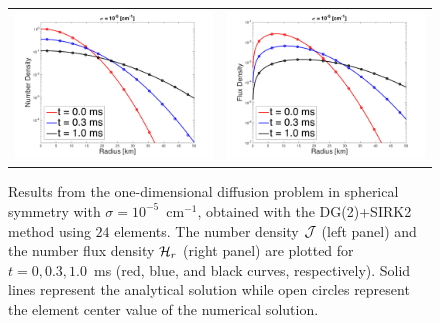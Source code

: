 \documentclass[10pt,preprint]{aastex}
\begin{document}
\begin{figure}
  \begin{center}
    \begin{tabular}{cc}
      \includegraphics[scale=0.38]{./Figures/GaussianSphericalDiffusion_Kappa_1e-5_Density} &
      \includegraphics[scale=0.38]{./Figures/GaussianSphericalDiffusion_Kappa_1e-5_Flux}
    \end{tabular}
  \end{center}
  \caption{Results from the one-dimensional diffusion problem in spherical symmetry with $\sigma=10^{-5}$~cm$^{-1}$, obtained with the DG(2)+SIRK2 method using $24$ elements.  
  The number density $\mathcal{J}$ (left panel) and the number flux density $\mathcal{H}_{r}$ (right panel) are plotted for $t=0,0.3,1.0$~ms (red, blue, and black curves, respectively).  
  Solid lines represent the analytical solution while open circles represent the element center value of the numerical solution.}
  \label{fig:diffusionProblem1e-5}
\end{figure}
\end{document}
